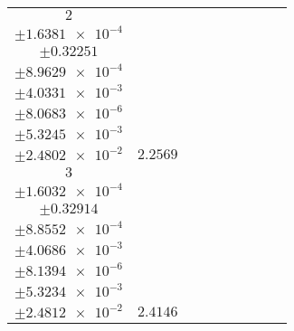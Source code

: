 \documentclass[8pt]{article}
\begin{document}
\begin{longtable}[l]{c c c c c c c c c}
$\num{2}$ & \begin{tabular}[c]{@{}c@{}}$\num{3.0215e-2}$ \\ $\pm\num{1.6381e-4}$\end{tabular} & \begin{tabular}[c]{@{}c@{}}$\num{0.28354}$ \\ $\pm\num{0.32251}$\end{tabular} & \begin{tabular}[c]{@{}c@{}}$\num{-7.4047}$ \\ $\pm\num{8.9629e-4}$\end{tabular} & \begin{tabular}[c]{@{}c@{}}$\num{723.27}$ \\ $\pm\num{4.0331e-3}$\end{tabular} & \begin{tabular}[c]{@{}c@{}}$\num{1.4469}$ \\ $\pm\num{8.0683e-6}$\end{tabular} & \begin{tabular}[c]{@{}c@{}}$\num{1.1772}$ \\ $\pm\num{5.3245e-3}$\end{tabular} & \begin{tabular}[c]{@{}c@{}}$\num{3.9657}$ \\ $\pm\num{2.4802e-2}$\end{tabular} & $\num{2.2569}$\\
$\num{3}$ & \begin{tabular}[c]{@{}c@{}}$\num{2.9827e-2}$ \\ $\pm\num{1.6032e-4}$\end{tabular} & \begin{tabular}[c]{@{}c@{}}$\num{-1.8584e-3}$ \\ $\pm\num{0.32914}$\end{tabular} & \begin{tabular}[c]{@{}c@{}}$\num{-6.9456}$ \\ $\pm\num{8.8552e-4}$\end{tabular} & \begin{tabular}[c]{@{}c@{}}$\num{723.74}$ \\ $\pm\num{4.0686e-3}$\end{tabular} & \begin{tabular}[c]{@{}c@{}}$\num{1.4479}$ \\ $\pm\num{8.1394e-6}$\end{tabular} & \begin{tabular}[c]{@{}c@{}}$\num{1.1583}$ \\ $\pm\num{5.3234e-3}$\end{tabular} & \begin{tabular}[c]{@{}c@{}}$\num{3.9685}$ \\ $\pm\num{2.4812e-2}$\end{tabular} & $\num{2.4146}$\\

\end{longtable}
\end{document}
